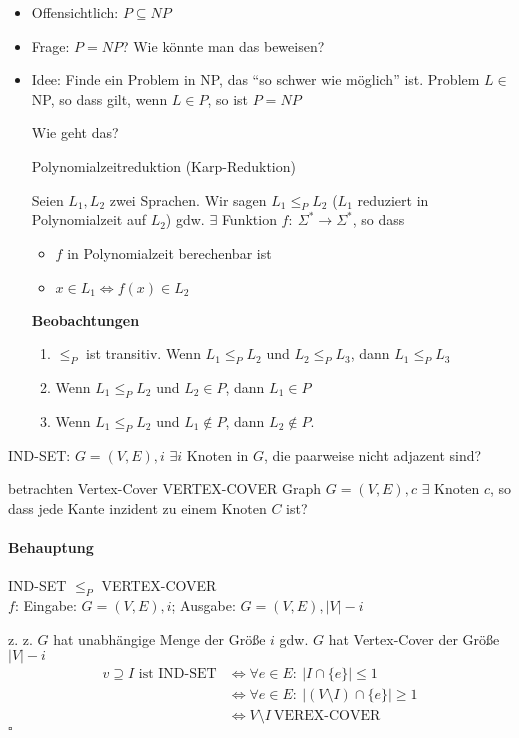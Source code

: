 \begin{itemize}
 \item Offensichtlich: $P \subseteq NP$
 \item Frage: $P = NP$? Wie könnte man das beweisen?
 \item Idee: Finde ein Problem in NP, das "`so schwer wie möglich"' ist. Problem $L \in$ NP, so dass gilt, wenn $L \in P$, so ist $P = NP$
     \par Wie geht das?
     \par Polynomialzeitreduktion (Karp-Reduktion)
     \par Seien $L_1, L_2$ zwei Sprachen.
         Wir sagen $L_1 \leq_P L_2$ ($L_1$ reduziert in Polynomialzeit auf $L_2$) gdw. $\exists$ Funktion $f{:}\ \Sigma^* \to \Sigma^*$, so dass
         \begin{itemize}
          \item $f$ in Polynomialzeit berechenbar ist
          \item $x \in L_1 \Leftrightarrow f(x) \in L_2$
         \end{itemize}
         \textbf{Beobachtungen}
         \begin{enumerate}
          \item $\leq_P$ ist transitiv. Wenn $L_1 \leq_P L_2$ und $L_2 \leq_P L_3$, dann $L_1 \leq_P L_3$
          \item Wenn $L_1 \leq_P L_2$ und $L_2 \in P$, dann $L_1 \in P$
          \item Wenn $L_1 \leq_P L_2$ und $L_1 \notin P$, dann $L_2 \notin P$.
         \end{enumerate}
\end{itemize}
\Bsp IND-SET:
\Geg $G = (V,E), i$
\Ges $\exists i$ Knoten in $G$, die paarweise nicht adjazent sind?\\[1.5em]
\par betrachten Vertex-Cover VERTEX-COVER
\Geg Graph $G = (V,E), c$
\Ges $\exists$ Knoten $c$, so dass jede Kante inzident zu einem Knoten $C$ ist?

\paragraph*{Behauptung} IND-SET $\leq_P$ VERTEX-COVER\\
$f$: Eingabe: $G = (V,E), i$; Ausgabe: $G = (V,E), |V| - i$
\par z. z. $G$ hat unabhängige Menge der Größe $i$ gdw. $G$ hat Vertex-Cover der Größe $|V|-i$
\begin{align*}
 v \supseteq I\text{ ist IND-SET} &\Leftrightarrow \forall e \in E{:}\ |I \cap \{e\}| \leq 1 \\
              &\Leftrightarrow \forall e \in E{:}\ |(V \setminus I) \cap \{e\}| \geq 1 \\
              &\Leftrightarrow V \setminus I\ \text{VEREX-COVER}
\end{align*}\hfill$\square$

